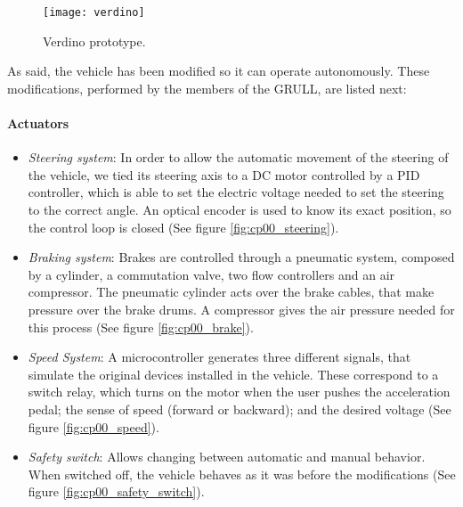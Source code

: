 \begin{figure}[h!]
  \centering
  \texttt{[image: verdino]}
  \caption{Verdino prototype.}\label{fig:cp00_verdino}
\end{figure}

As said, the vehicle has been modified so it can operate autonomously. These modifications, performed by the members of the GRULL, are listed next:

\paragraph{Actuators}\label{ch:chapter00_03_00_00_01}
\begin{itemize}
 \item \emph{Steering system}: In order to allow the automatic movement of the steering of the vehicle, we tied its steering axis to a DC motor controlled by a \ac{PID} controller, which is able to set the electric voltage needed to set the steering to the correct angle. An optical encoder is used to know its exact position, so the control loop is closed (See figure \ref{fig:cp00_steering}).
 \item \emph{Braking system}: Brakes are controlled through a pneumatic system, composed by a cylinder, a commutation valve, two flow controllers and an air compressor. The pneumatic cylinder acts over the brake cables, that make pressure over the brake drums. A compressor gives the air pressure needed for this process (See figure \ref{fig:cp00_brake}).
 \item \emph{Speed System}: A microcontroller generates three different signals, that simulate the original devices installed in the vehicle. These correspond to a switch relay, which turns on the motor when the user pushes the acceleration pedal; the sense of speed (forward or backward); and the desired voltage (See figure \ref{fig:cp00_speed}).
 \item \emph{Safety switch}: Allows changing between automatic and manual behavior. When switched off, the vehicle behaves as it was before the modifications (See figure \ref{fig:cp00_safety_switch}).
\end{itemize}

